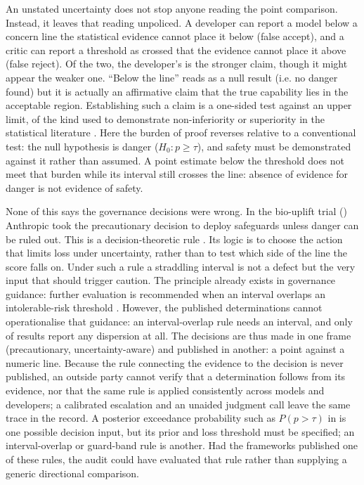 \documentclass{article}
\begin{document}
An unstated uncertainty does not stop anyone reading the point comparison. Instead, it leaves that reading unpoliced. A developer can report a model below a concern line the statistical evidence cannot place it below (false accept), and a critic can report a threshold as crossed that the evidence cannot place it above (false reject). Of the two, the developer's is the stronger claim, though it might appear the weaker one. ``Below the line'' reads as a null result (i.e. no danger found) but it is actually an affirmative claim that the true capability lies in the acceptable region. Establishing such a claim is a one-sided test against an upper limit, of the kind used to demonstrate non-inferiority or superiority in the statistical literature \citep{lakens2017,wellek2010}. Here the burden of proof reverses relative to a conventional test: the null hypothesis is danger ($H_0\!: p \geq \tau$), and safety must be demonstrated against it rather than assumed. A point estimate below the threshold does not meet that burden while its
interval still crosses the line: absence of evidence for danger is not evidence of safety.






None of this says the governance decisions were wrong. In the bio-uplift trial
() Anthropic took the precautionary decision to deploy safeguards unless
danger can be ruled out. This is a decision-theoretic rule
\citep{wald1950statistical,taleb2014precautionary}. Its logic is to choose the action that
limits loss under uncertainty, rather than to test which side of the line the score falls on.
Under such a rule a straddling interval is not a defect but the very input that should
trigger caution. The principle already exists in governance
guidance: further evaluation is recommended when an interval overlaps an
intolerable-risk threshold \citep{raman2025intolerable}. However, the published
determinations cannot operationalise that guidance: an interval-overlap rule needs an
interval, and only \CensusUncertainty{} of \CensusTotal{} results report any dispersion
at all. The decisions are thus made in one frame (precautionary, uncertainty-aware)
and published in another: a point against a numeric line. Because the rule connecting
the evidence to the decision is never published, an outside party cannot verify that a
determination follows from its evidence, nor that the same rule is applied consistently
across models and developers; a calibrated escalation and an unaided judgment call leave
the same trace in the record. A posterior exceedance probability such as
$P(p > \tau)$ in  is one possible decision input, but its prior and loss
threshold must be specified; an interval-overlap or guard-band rule is another. Had the
frameworks published one of these rules, the audit could have evaluated that rule rather
than supplying a generic directional comparison.
\end{document}
